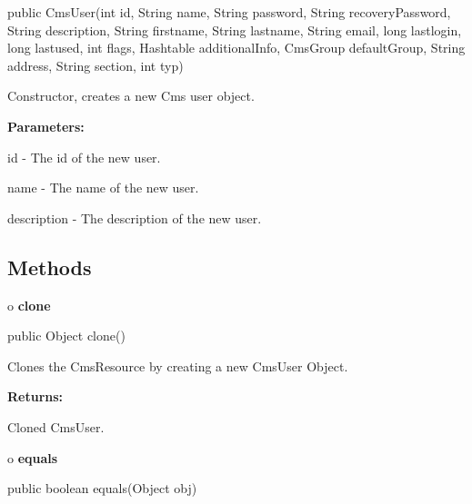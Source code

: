 \begin{PRE}
 public CmsUser(int id,
                String name,
                String password,
                String recoveryPassword,
                String description,
                String firstname,
                String lastname,
                String email,
                long lastlogin,
                long lastused,
                int flags,
                Hashtable additionalInfo,
                CmsGroup defaultGroup,
                String address,
                String section,
                int typ)
\end{PRE}

\begin{description}
\htmlDD Constructor, creates a new Cms user object. 

\begin{description}
\item {\bf Parameters:}  

id - The id of the new user.  

name - The name of the new user.  

description - The description of the new user.  
\end{description}

\end{description}

\subsection*{  Methods }

o {\bf clone} 

\begin{PRE}
 public Object clone()
\end{PRE}

\begin{description}
\htmlDD Clones the CmsResource by creating a new CmsUser Object. 

\begin{description}
\item {\bf Returns:}  

Cloned CmsUser.  
\end{description}

\end{description}

o {\bf equals} 

\begin{PRE}
 public boolean equals(Object obj)
\end{PRE}

